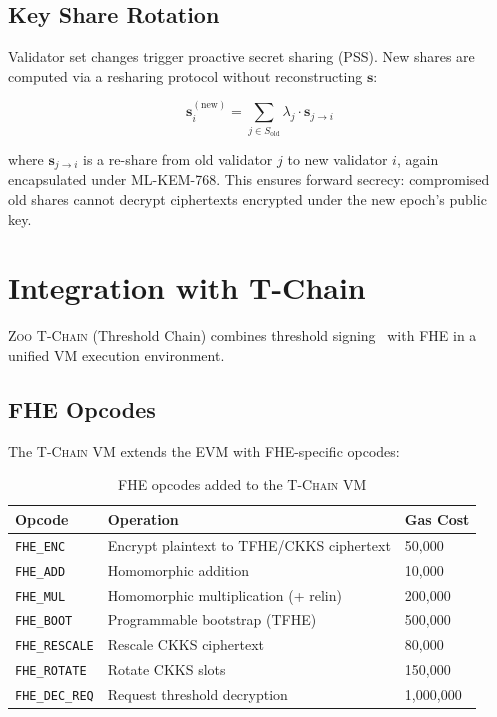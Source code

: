 \documentclass[11pt,letterpaper]{article}
\theoremstyle{definition}
\theoremstyle{remark}
\newcommand{\Zoo}{\textsc{Zoo}}
\newcommand{\TChain}{\textsc{T-Chain}}
\newcommand{\TFHE}{\textsc{TFHE}}
\newcommand{\CKKS}{\textsc{CKKS}}
\newcommand{\MLKEM}{\textsc{ML-KEM}}
\begin{document}
\subsection{Key Share Rotation}

Validator set changes trigger proactive secret sharing (PSS). New shares are computed via a resharing protocol without reconstructing $\mathbf{s}$:

\begin{equation}
  \mathbf{s}_i^{(\mathrm{new})} = \sum_{j \in S_{\mathrm{old}}} \lambda_j \cdot \mathbf{s}_{j \to i}
\end{equation}

\noindent where $\mathbf{s}_{j \to i}$ is a re-share from old validator $j$ to new validator $i$, again encapsulated under \MLKEM{}-768. This ensures forward secrecy: compromised old shares cannot decrypt ciphertexts encrypted under the new epoch's public key.

\section{Integration with T-Chain}
\label{sec:tchain}

\Zoo{} \TChain{} (Threshold Chain) combines threshold signing~\cite{zoo-threshold-signatures} with FHE in a unified VM execution environment.

\subsection{FHE Opcodes}

The \TChain{} VM extends the EVM with FHE-specific opcodes:

\begin{table}[h]
\centering
\small
\begin{tabular}{lll}
\toprule
\textbf{Opcode} & \textbf{Operation} & \textbf{Gas Cost} \\
\midrule
\texttt{FHE\_ENC} & Encrypt plaintext to \TFHE{}/\CKKS{} ciphertext & 50{,}000 \\
\texttt{FHE\_ADD} & Homomorphic addition & 10{,}000 \\
\texttt{FHE\_MUL} & Homomorphic multiplication (+ relin) & 200{,}000 \\
\texttt{FHE\_BOOT} & Programmable bootstrap (\TFHE{}) & 500{,}000 \\
\texttt{FHE\_RESCALE} & Rescale \CKKS{} ciphertext & 80{,}000 \\
\texttt{FHE\_ROTATE} & Rotate \CKKS{} slots & 150{,}000 \\
\texttt{FHE\_DEC\_REQ} & Request threshold decryption & 1{,}000{,}000 \\
\bottomrule
\end{tabular}
\caption{FHE opcodes added to the \TChain{} VM}
\label{tab:opcodes}
\end{table}
\end{document}
